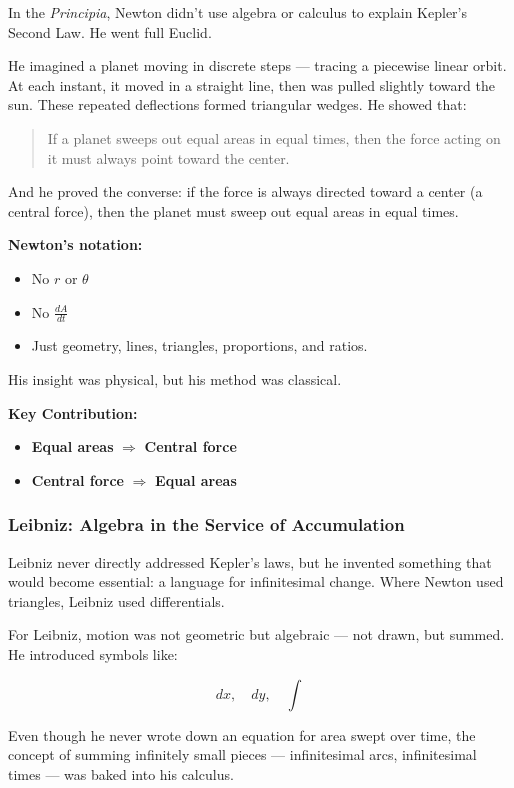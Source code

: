 In the \textit{Principia}, Newton didn’t use algebra or calculus to explain Kepler’s Second Law. He went full Euclid.

He imagined a planet moving in discrete steps — tracing a piecewise linear orbit. At each instant, it moved in a straight line, then was pulled slightly toward the sun. These repeated deflections formed triangular wedges. He showed that:

\begin{quote}
If a planet sweeps out equal areas in equal times, then the force acting on it must always point toward the center.
\end{quote}

And he proved the converse: if the force is always directed toward a center (a central force), then the planet must sweep out equal areas in equal times.

\textbf{Newton’s notation:}
\begin{itemize}
    \item No \( r \) or \( \theta \)
    \item No \( \frac{dA}{dt} \)
    \item Just geometry, lines, triangles, proportions, and ratios.
\end{itemize}

His insight was physical, but his method was classical.

\textbf{Key Contribution:}
\begin{itemize}
    \item \textbf{Equal areas} \(\Rightarrow\) \textbf{Central force}
    \item \textbf{Central force} \(\Rightarrow\) \textbf{Equal areas}
\end{itemize}

\subsubsection*{Leibniz: Algebra in the Service of Accumulation}

Leibniz never directly addressed Kepler’s laws, but he invented something that would become essential: a language for infinitesimal change. Where Newton used triangles, Leibniz used differentials.

For Leibniz, motion was not geometric but algebraic — not drawn, but summed. He introduced symbols like:

\[
dx, \quad dy, \quad \int
\]

Even though he never wrote down an equation for area swept over time, the concept of summing infinitely small pieces — infinitesimal arcs, infinitesimal times — was baked into his calculus.

